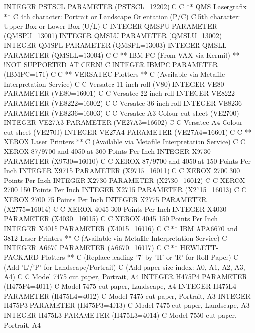 \begin{XMP}
      INTEGER    PSTSCL
      PARAMETER (PSTSCL=12202)
C
C  ** QMS Lasergrafix  **
C     4th character: Portrait or Landscape Orientation (P/C)
C     5th character: Upper Box or Lower Box (U/L)
C
      INTEGER    QMSPU
      PARAMETER (QMSPU=13001)
      INTEGER    QMSLU
      PARAMETER (QMSLU=13002)
      INTEGER    QMSPL
      PARAMETER (QMSPL=13003)
      INTEGER    QMSLL
      PARAMETER (QMSLL=13004)
C
C  ** IBM PC (From VAX via Kermit)  ** !NOT SUPPORTED AT CERN!
C
      INTEGER    IBMPC
      PARAMETER (IBMPC=171)
C
C **  VERSATEC Plotters  **
C     (Available via Metafile Interpretation Service)
C
C     Versatec 11 inch roll (V80)
      INTEGER    VE80
      PARAMETER (VE80=16001)
C
C     Versatec 22 inch roll
      INTEGER    VE8222
      PARAMETER (VE8222=16002)
C
C     Versatec 36 inch roll
      INTEGER    VE8236
      PARAMETER (VE8236=16003)
C
C     Versatec A3 Colour cut sheet (VE2700)
      INTEGER    VE27A3
      PARAMETER (VE27A3=16602)
C
C     Versatec A4 Colour cut sheet (VE2700)
      INTEGER    VE27A4
      PARAMETER (VE27A4=16601)
C
C **  XEROX Laser Printers  **
C     (Available via Metafile Interpretation Service)
C
C     XEROX 87/9700 and 4050 at 300 Points Per Inch
      INTEGER    X9730
      PARAMETER (X9730=16010)
C
C     XEROX 87/9700 and 4050 at 150 Points Per Inch
      INTEGER    X9715
      PARAMETER (X9715=16011)
C
C     XEROX 2700 300 Points Per Inch
      INTEGER    X2730
      PARAMETER (X2730=16012)
C
C     XEROX 2700 150 Points Per Inch
      INTEGER    X2715
      PARAMETER (X2715=16013)
C
C     XEROX 2700  75 Points Per Inch
      INTEGER    X2775
      PARAMETER (X2775=16014)
C
C     XEROX 4045 300 Points Per Inch
      INTEGER    X4030
      PARAMETER (X4030=16015)
C
C     XEROX 4045 150 Points Per Inch
      INTEGER    X4015
      PARAMETER (X4015=16016)
C
C **  IBM APA6670 and 3812 Laser Printers  **
C     (Available via Metafile Interpretation Service)
C
      INTEGER    A6670
      PARAMETER (A6670=16017)
C
C **  HEWLETT-PACKARD Plotters  **
C     (Replace leading '7' by 'H' or 'R' for Roll Paper)
C     (Add 'L'/'P' for Landscape/Portrait)
C     (Add paper size index: A0, A1, A2, A3, A4)
C
C     Model      7475 cut paper,  Portrait,   A4
      INTEGER    H475P4
      PARAMETER (H475P4=4011)
C     Model      7475 cut paper,  Landscape,  A4
      INTEGER    H475L4
      PARAMETER (H475L4=4012)
C     Model      7475 cut paper,  Portrait,   A3
      INTEGER    H475P3
      PARAMETER (H475P3=4013)
C     Model      7475 cut paper,  Landscape,  A3
      INTEGER    H475L3
      PARAMETER (H475L3=4014)
C     Model      7550 cut paper,  Portrait,   A4

\end{XMP}
